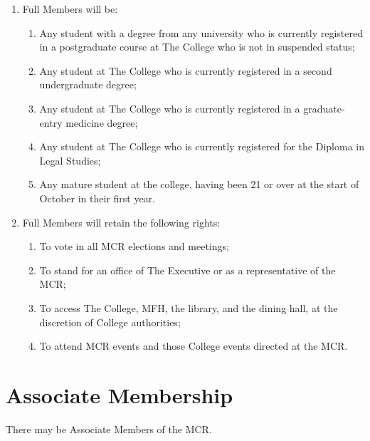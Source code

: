 \documentclass[11pt, a4paper]{article}
\begin{document}
\begin{enumerate}
    \item Full Members will be:
    \begin{enumerate}
        \item Any student with a degree from any university who is currently registered in a postgraduate course at The College who is not in suspended status;
        \item Any student at The College who is currently registered in a second undergraduate degree;
        \item Any student at The College who is currently registered in a graduate-entry medicine degree;
        \item Any student at The College who is currently registered for the Diploma in Legal Studies;
        \item Any mature student at the college, having been 21 or over at the start of October in their first year.
    \end{enumerate}
    \item Full Members will retain the following rights:
    \begin{enumerate}
        \item To vote in all MCR elections and meetings;
        \item To stand for an office of The Executive or as a representative of the MCR;
        \item To access The College, MFH, the library, and the dining hall, at the discretion of College authorities;
        \item To attend MCR events and those College events directed at the MCR.
    \end{enumerate}
\end{enumerate}





\section{Associate Membership}
\label{sec:associate_membership}

There may be Associate Members of the MCR.
\end{document}

